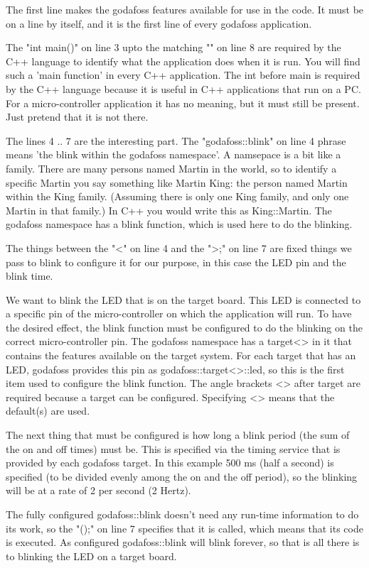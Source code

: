 \documentclass{article}
\begin{document}
The first line makes the godafoss features available for use in the code.
It must be on a line by itself, and it is the first line of every godafoss
application.

The "int main(){" on line 3 upto the matching "}" on line 8 are required
by the C++ language to identify what the application does when it is run.
You will find such a 'main function' in every C++ application.
The int before main is required by the C++ language because it is
useful in C++ applications that run on a PC.
For a micro-controller application it has no meaning, but it must still be
present.
Just pretend that it is not there.

The lines 4 .. 7 are the interesting part.
The "godafoss::blink" on line 4 phrase means
'the blink within the godafoss namespace'.
A namsepace is a bit like a family.
There are many persons named Martin in the world, so to identify a specific
Martin you say something like Martin King: the person named Martin
within the King family.
(Assuming there is only one King family, and only one
Martin in that family.)
In C++ you would write this as King::Martin.
The godafoss namespace has a blink function,
which is used here to do the blinking.

The things between the "<" on line 4 and the ">;" on line 7 are
fixed things we pass to blink to configure it for our purpose,
in this case the LED pin and the blink time.

We want to blink the LED that is on the target board.
This LED is connected to a specific pin of the micro-controller
on which the application will run.
To have the desired effect, the blink function must be configured to
do the blinking on the correct micro-controller pin.
The godafoss namespace has a target<> in it that contains the
features available on the target system.
For each target that has an LED, godafoss provides this pin
as godafoss::target<>::led, so this is the first item used
to configure the blink function.
The angle brackets <> after target are required because a target
can be configured.
Specifying <> means that the default(s) are used.

The next thing that must be configured is how long a blink period
(the sum of the on and off times) must be.
This is specified via the timing service that is provided by each godafoss target.
In this example 500 ms (half a second) is specified
(to be divided evenly among the on and the off period),
so the blinking will be at a rate of 2 per second (2 Hertz).

The fully configured godafoss::blink doesn't need any run-time information
to do its work, so the "();" on line 7 specifies that it is called,
which means that its code is executed.
As configured godafoss::blink will blink forever, so that
is all there is to blinking the LED on a target board.
\end{document}
